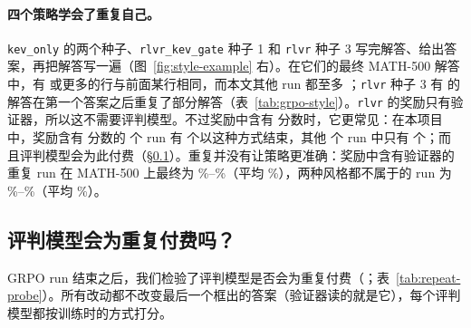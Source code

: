 \begin{table}[t]
\centering\small

\caption{以非正式草稿开头的训练解答，按 50 步的窗口：它们所占比例，以及 $\Delta$ right：在同时含有两类解答的组上取平均的、草稿被验证器判为正确的比例减去同组其他解答的这一比例（百分点）。}
\label{tab:grpo-draftgroups}
\end{table}

\paragraph{四个策略学会了重复自己。} \texttt{kev\_only} 的两个种子、\texttt{rlvr\_kev\_gate} 种子 1 和 \texttt{rlvr} 种子 3 写完解答、给出答案，再把解答写一遍（图~\ref{fig:style-example} 右）。在它们的最终 MATH-500 解答中，有  或更多的行与前面某行相同，而本文其他 run 都至多 ；\texttt{rlvr} 种子 3 有  的解答在第一个答案之后重复了部分解答（表~\ref{tab:grpo-style}）。\texttt{rlvr} 的奖励只有验证器，所以这不需要评判模型。不过奖励中含有 \kev{} 分数时，它更常见：在本项目中，奖励含有 \kev{} 分数的  个 run 有  个以这种方式结束，其他  个 run 中只有  个；而且评判模型会为此付费（\S\ref{sec:res-repeat}）。重复并没有让策略更准确：奖励中含有验证器的重复 run 在 MATH-500 上最终为 \%--\%（平均 \%），两种风格都不属于的 run 为 \%--\%（平均 \%）。

\begin{table}[t]
\centering\small
\setlength{\tabcolsep}{4.5pt}

\caption{每个最终策略在 MATH-500 上写了什么（贪心）：解答词元数、在 2048 词元处被截断的比例、（至少 20 个字符的）行与同一解答前面某行相同的比例、在第一个框出答案之后重复这样一行的解答比例、含有多个框出答案的解答比例（验证器读最后一个）、以非正式草稿开头的解答比例，以及 \kev{} 对正确与错误答案的 $\pc$。}
\label{tab:grpo-style}
\end{table}

\subsection{评判模型会为重复付费吗？}\label{sec:res-repeat}

GRPO run 结束之后，我们检验了评判模型是否会为重复付费（；表~\ref{tab:repeat-probe}）。所有改动都不改变最后一个框出的答案（验证器读的就是它），每个评判模型都按训练时的方式打分。

